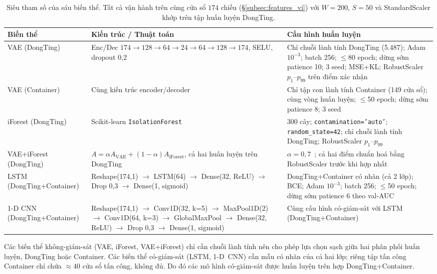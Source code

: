 \begin{table}[!t]
\centering
\caption{Siêu tham số của sáu biến thể. Tất cả vận hành trên cùng cửa
sổ $174$ chiều (\S\ref{subsec:features_vi}) với $W=200$, $S=50$ và
StandardScaler khớp trên tập huấn luyện DongTing.}
\label{tab:v2_hyperparams_vi}
\scriptsize
\setlength{\tabcolsep}{4pt}
\renewcommand{\arraystretch}{1.15}
\begin{tabularx}{\textwidth}{@{}p{3.6cm} X X@{}}
\toprule
\textbf{Biến thể} & \textbf{Kiến trúc / Thuật toán} & \textbf{Cấu hình huấn luyện} \\
\midrule
VAE (DongTing)
  & Enc/Dec $174{\rightarrow}128{\rightarrow}64{\rightarrow}24{\rightarrow}64{\rightarrow}128{\rightarrow}174$, SELU, dropout 0,2
  & Chỉ chuỗi lành tính DongTing (5.487); Adam $10^{-3}$; batch 256; $\le$80 epoch; dừng sớm patience 10; 3 seed; MSE+KL; RobustScaler $p_{1}$--$p_{99}$ trên điểm xác nhận \\
VAE (Container)
  & Cùng kiến trúc encoder/decoder
  & Chỉ tập con lành tính Container (149 cửa sổ); cùng vòng huấn luyện; $\le$50 epoch; dừng sớm patience 8; 3 seed \\
iForest (DongTing)
  & Scikit-learn \texttt{IsolationForest}
  & 300 cây; \texttt{contamination='auto'}; \texttt{random\_state=42}; chỉ chuỗi lành tính DongTing; RobustScaler $p_{1}$--$p_{99}$ \\
VAE+iForest (DongTing)
  & $A = \alpha A_{\text{VAE}} + (1{-}\alpha) A_{\text{iForest}}$, cả hai huấn luyện trên DongTing
  & $\alpha = 0{,}7$~\cite{desfam2025}; cả hai điểm chuẩn hoá bằng RobustScaler trước khi hợp nhất \\
LSTM (DongTing+Container)
  & Reshape(174,1) $\to$ LSTM(64) $\to$ Dense(32, ReLU) $\to$ Drop 0,3 $\to$ Dense(1, sigmoid)
  & DongTing+Container có nhãn (cả 2 lớp); BCE; Adam $10^{-3}$; batch 256; $\le$50 epoch; dừng sớm patience 6 theo val-AUC \\
1-D CNN (DongTing+Container)
  & Reshape(174,1) $\to$ Conv1D(32, k=5) $\to$ MaxPool1D(2) $\to$ Conv1D(64, k=3) $\to$ GlobalMaxPool $\to$ Dense(32, ReLU) $\to$ Drop 0,3 $\to$ Dense(1, sigmoid)
  & Cùng cấu hình có-giám-sát với LSTM (DongTing+Container) \\
\bottomrule
\end{tabularx}
\end{table}

Các biến thể không-giám-sát (VAE, iForest, VAE+iForest) chỉ cần chuỗi
lành tính nên cho phép lựa chọn sạch giữa hai phân phối huấn luyện,
DongTing hoặc Container. Các biến thể có-giám-sát (LSTM, 1-D~CNN) cần
mẫu có nhãn của cả hai lớp; riêng tập tấn công Container chỉ chứa
$\approx\!40$ cửa sổ tấn công, không đủ. Do đó các mô hình có-giám-sát
được huấn luyện trên hợp DongTing+Container.

